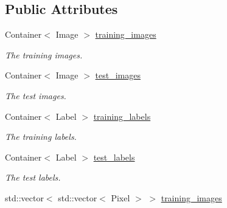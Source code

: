 \subsection*{Public Attributes}
\begin{DoxyCompactItemize}
\item 
\mbox{\label{structmnist_1_1MNIST__dataset_a1f7de5199e4d5422b00a5f7059fdf7fe}} 
Container$<$ Image $>$ \hyperlink{structmnist_1_1MNIST__dataset_a1f7de5199e4d5422b00a5f7059fdf7fe}{training\+\_\+images}
\begin{DoxyCompactList}\small\item\em The training images. \end{DoxyCompactList}\item 
\mbox{\label{structmnist_1_1MNIST__dataset_a860afe7317905d6a9c6acca0ae30e78e}} 
Container$<$ Image $>$ \hyperlink{structmnist_1_1MNIST__dataset_a860afe7317905d6a9c6acca0ae30e78e}{test\+\_\+images}
\begin{DoxyCompactList}\small\item\em The test images. \end{DoxyCompactList}\item 
\mbox{\label{structmnist_1_1MNIST__dataset_ad7462a2e89dfe0dd36e16e29f50acf06}} 
Container$<$ Label $>$ \hyperlink{structmnist_1_1MNIST__dataset_ad7462a2e89dfe0dd36e16e29f50acf06}{training\+\_\+labels}
\begin{DoxyCompactList}\small\item\em The training labels. \end{DoxyCompactList}\item 
\mbox{\label{structmnist_1_1MNIST__dataset_a1091194fd30f657921556e4681b64337}} 
Container$<$ Label $>$ \hyperlink{structmnist_1_1MNIST__dataset_a1091194fd30f657921556e4681b64337}{test\+\_\+labels}
\begin{DoxyCompactList}\small\item\em The test labels. \end{DoxyCompactList}\item 
\mbox{\label{structmnist_1_1MNIST__dataset_a30aaff2a3cd0e08879ece7fd7110ba96}} 
std\+::vector$<$ std\+::vector$<$ Pixel $>$ $>$ \hyperlink{structmnist_1_1MNIST__dataset_a30aaff2a3cd0e08879ece7fd7110ba96}{training\+\_\+images}

\end{DoxyCompactItemize}
